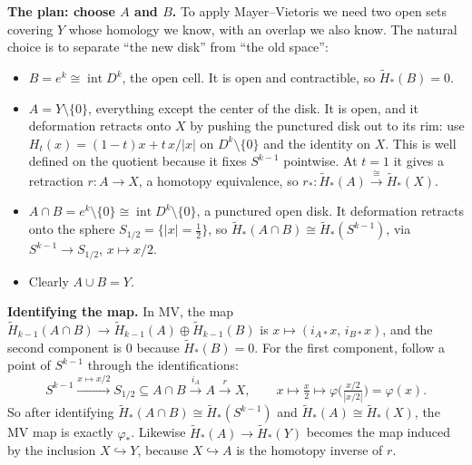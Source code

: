 \documentclass[11pt]{article}
\newcommand{\Hred}{\tilde H}
\newcommand{\fig}[2]{\begin{center}\resizebox{#2}{!}{}\end{center}}
\theoremstyle{definition}
\begin{document}
\medskip\noindent\textbf{The plan: choose $A$ and $B$.} To apply Mayer--Vietoris we need two open sets covering $Y$ whose homology we know, with an overlap we also know. The natural choice is to separate ``the new disk'' from ``the old space'':
\fig{cell-attach}{0.95\textwidth}
\begin{itemize}
\item $B=e^k\cong\operatorname{int}D^k$, the open cell. It is open and contractible, so $\Hred_*(B)=0$.
\item $A=Y\setminus\{0\}$, everything except the center of the disk. It is open, and it deformation retracts onto $X$ by pushing the punctured disk out to its rim: use $H_t(x)=(1-t)x+t\,x/|x|$ on $D^k\setminus\{0\}$ and the identity on $X$. This is well defined on the quotient because it fixes $S^{k-1}$ pointwise. At $t=1$ it gives a retraction $r:A\to X$, a homotopy equivalence, so $r_*:\Hred_*(A)\xrightarrow{\cong}\Hred_*(X)$.
\item $A\cap B=e^k\setminus\{0\}\cong\operatorname{int}D^k\setminus\{0\}$, a punctured open disk. It deformation retracts onto the sphere $S_{1/2}=\{|x|=\tfrac12\}$, so $\Hred_*(A\cap B)\cong\Hred_*(S^{k-1})$, via $S^{k-1}\to S_{1/2}$, $x\mapsto x/2$.
\item Clearly $A\cup B=Y$.
\end{itemize}

\medskip\noindent\textbf{Identifying the map.} In MV, the map $\Hred_{k-1}(A\cap B)\to\Hred_{k-1}(A)\oplus\Hred_{k-1}(B)$ is $x\mapsto(i_{A*}x,\,i_{B*}x)$, and the second component is $0$ because $\Hred_*(B)=0$. For the first component, follow a point of $S^{k-1}$ through the identifications:
\[S^{k-1}\xrightarrow{x\mapsto x/2}S_{1/2}\subseteq A\cap B\xrightarrow{i_A}A\xrightarrow{r}X,\qquad x\mapsto \tfrac x2\mapsto \varphi\big(\tfrac{x/2}{|x/2|}\big)=\varphi(x).\]
So after identifying $\Hred_*(A\cap B)\cong\Hred_*(S^{k-1})$ and $\Hred_*(A)\cong\Hred_*(X)$, the MV map is exactly $\varphi_*$. Likewise $\Hred_*(A)\to\Hred_*(Y)$ becomes the map induced by the inclusion $X\hookrightarrow Y$, because $X\hookrightarrow A$ is the homotopy inverse of $r$.
\end{document}
